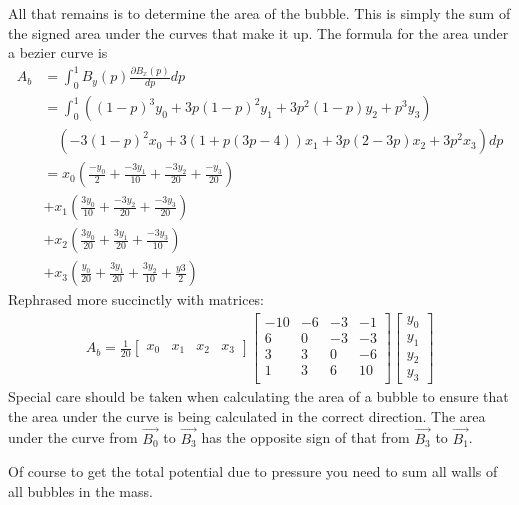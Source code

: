 \documentclass{article}
\begin{document}
All that remains is to determine the area of the bubble. This is simply the sum
of the signed area under the curves that make it up. The formula for the area
under a bezier curve is
\begin{align*}
A_b &= \int_0^1 B_y(p)\frac{\partial B_x(p)}{dp} dp\\
&=\int_0^1
\left((1-p)^3y_0+3p(1-p)^2y_1+3p^2(1-p)y_2+p^3y_3\right)\\
&\quad \left(-3(1-p)^2x_0 +3(1+p(3p-4))x_1+3p(2-3p)x_2 +3p^2x_3\right)dp\\
&= x_0\left( \frac{-y_0}{2}+ \frac{-3y_1}{10}+\frac{-3y_2}{20}+\frac{-y_3}{20}\right)\\
&+ x_1\left(\frac{3y_0}{10}+ \frac{-3y_2}{20} +\frac{-3y_3}{20}\right)\\
&+ x_2\left(\frac{3y_0}{20}+ \frac{3y_1}{20} +\frac{-3y_3}{10}\right)\\
&+ x_3\left(\frac{y_0}{20} + \frac{3y_1}{20} +\frac{3y_2}{10}
+\frac{y3}{2}\right)
\end{align*}
Rephrased more succinctly with matrices:
\begin{align*}
A_b=
\frac{1}{20} 
\begin{bmatrix} x_0 & x_1 & x_2 & x_3 \end{bmatrix}
\begin{bmatrix} 
-10 & -6 & -3 & -1\\
6 & 0 & -3 & -3\\
3 & 3 & 0 & -6\\
1 & 3 & 6 & 10\\ 
\end{bmatrix}
\left[ \begin{array}{c} y_0\\y_1\\y_2\\y_3 \end{array} \right] 
\end{align*}
Special care should be taken when calculating the area of a bubble to ensure
that the area under the curve is being calculated in the correct direction.
The area under the curve from $\vec{B_0}$ to $\vec{B_3}$ has the opposite sign
of that from $\vec{B_3}$ to $\vec{B_1}$.

Of course to get the total potential due to pressure you need to sum all walls
of all bubbles in the mass.
\end{document}
